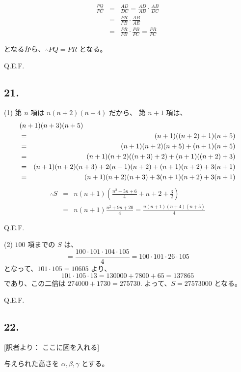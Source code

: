 \begin{eqnarray*}
\frac{PQ}{PC}
&=& \frac{AD}{DC} = \frac{AD}{AB} \cdot \frac{AB}{DC}\\
&=& \frac{PR}{PB} \cdot \frac{AB}{AE}\\
&=& \frac{PR}{PB} \cdot \frac{PB}{PC} = \frac{PR}{PC}
\end{eqnarray*}

となるから、$\therefore PQ = PR$ となる。

Q.E.F.

\subsection*{21.}

(1)
第 $n$ 項は $n(n+2)(n+4)$ だから、
第 $n+1$ 項は、
\begin{eqnarray*}
\lefteqn{(n+1)(n+3)(n+5)}\\
&=&
(n+1)((n+2) + 1)(n+5)\\
&=&
(n+1)(n+2)(n+5) + (n+1)(n+5)\\
&=&
(n+1)(n+2)((n+3)+2) + (n+1)((n+2)+3)\\
&=&
(n+1)(n+2)(n+3) + 2(n+1)(n+2) + (n+1)(n+2) + 3(n+1)\\
&=&
(n+1)(n+2)(n+3) + 3(n+1)(n+2) + 3(n+1)
\end{eqnarray*}
\begin{eqnarray*}
\therefore
S 
&=& n(n+1)\left( \frac{n^2 + 5n + 6}{4} + n + 2 + \frac{3}{2} \right)\\
&=& n(n+1)\frac{n^2 + 9n + 20}{4}
= \frac{n(n+1)(n+4)(n+5)}{4}
\end{eqnarray*}

Q.E.F.

(2)
$100$ 項までの $S$ は、
\[
= \frac{100 \cdot 101 \cdot 104 \cdot 105}{4}
= 100 \cdot 101 \cdot 26 \cdot 105
\]
となって、$101 \cdot 105 = 10605$ より、
\[
101 \cdot 105 \cdot 13 = 130000 + 7800 + 65 = 137865
\]
であり、この二倍は $274000 + 1730 = 275730$.
よって、$S = 27573000$ となる。

Q.E.F.

\subsection*{22.}

[訳者より： ここに図を入れる]

与えられた高さを $\alpha, \beta, \gamma$ とする。

